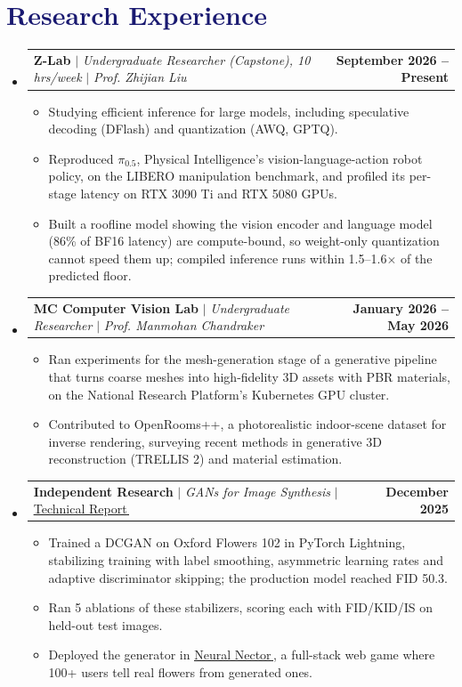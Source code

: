 \documentclass[letterpaper,11pt]{article}
\makeatletter
\newcommand{\resumeItem}[1]{
  \item\small{
    {#1\vspace{\bulletGap}}
  }
}
\newcommand{\resumeProjectHeading}[2]{
    \needspace{4\baselineskip}\item
    \begin{tabular*}{1.001\textwidth}{l@{\extracolsep{\fill}}r}
      \small#1 & \textbf{\small #2}\\
    \end{tabular*}\vspace{\headingGap}
}
\newcommand{\resumeSubHeadingListStart}{\begin{itemize}[leftmargin=0.0in, label={}]}
\newcommand{\resumeSubHeadingListEnd}{\end{itemize}}
\newcommand{\resumeItemListStart}{\begin{itemize}[itemsep=0pt, parsep=0pt]}
\newcommand{\resumeItemListEnd}{\end{itemize}\vspace{\entryGap}}
\newcommand{\cvlink}[2]{\href{#1}{\underline{#2}\,\raisebox{0.1\height}{\tiny\faExternalLink*}}}
\newcommand\accentColor{MidnightBlue}
\newlength{\headingGap}\setlength{\headingGap}{-4pt}            %
\newlength{\bulletGap}\setlength{\bulletGap}{0pt}               %
\newlength{\entryGap}\setlength{\entryGap}{-15pt}               %
\makeatother
\begin{document}
\section{\textcolor{\accentColor}{Research Experience}}
\resumeSubHeadingListStart
\resumeProjectHeading{\textbf{Z-Lab} $|$ \emph{Undergraduate Researcher (Capstone), 10 hrs/week} $|$ \emph{Prof. Zhijian Liu}}{September 2026 -- Present}
\resumeItemListStart
    \resumeItem{Studying efficient inference for large models, including speculative decoding (DFlash) and quantization (AWQ, GPTQ).}
    \resumeItem{Reproduced $\pi_{0.5}$, Physical Intelligence's vision-language-action robot policy, on the LIBERO manipulation benchmark, and profiled its per-stage latency on RTX 3090 Ti and RTX 5080 GPUs.}
    \resumeItem{Built a roofline model showing the vision encoder and language model (86\% of BF16 latency) are compute-bound, so weight-only quantization cannot speed them up; compiled inference runs within 1.5--1.6$\times$ of the predicted floor.}
\resumeItemListEnd

\resumeProjectHeading{\textbf{MC Computer Vision Lab} $|$ \emph{Undergraduate Researcher} $|$ \emph{Prof. Manmohan Chandraker}}{January 2026 -- May 2026}
\resumeItemListStart
    \resumeItem{Ran experiments for the mesh-generation stage of a generative pipeline that turns coarse meshes into high-fidelity 3D assets with PBR materials, on the National Research Platform's Kubernetes GPU cluster.}
    \resumeItem{Contributed to OpenRooms++, a photorealistic indoor-scene dataset for inverse rendering, surveying recent methods in generative 3D reconstruction (TRELLIS 2) and material estimation.}
\resumeItemListEnd

\resumeProjectHeading{\textbf{Independent Research} $|$ \emph{GANs for Image Synthesis} $|$ \cvlink{https://neuralnector.issacroy.com/report.pdf}{Technical Report}}{December 2025}
\resumeItemListStart
    \resumeItem{Trained a DCGAN on Oxford Flowers 102 in PyTorch Lightning, stabilizing training with label smoothing, asymmetric learning rates and adaptive discriminator skipping; the production model reached FID 50.3.}
    \resumeItem{Ran 5 ablations of these stabilizers, scoring each with FID/KID/IS on held-out test images.}
    \resumeItem{Deployed the generator in \cvlink{https://neuralnector.issacroy.com}{Neural Nector}, a full-stack web game where 100+ users tell real flowers from generated ones.}
\resumeItemListEnd
\resumeSubHeadingListEnd

\end{document}
